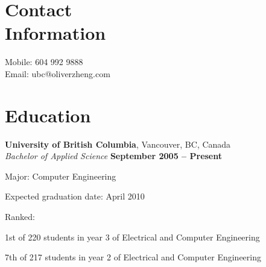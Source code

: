 \documentclass[margin,line]{resume}
\begin{document}
\begin{resume}

    \section{\mysidestyle Contact\\Information}

    Mobile: 604 992 9888       %
        \vspace{0mm}\\\vspace{0mm}%
    Email: ubc@oliverzheng.com %

    \section{\mysidestyle Education}

    \textbf{University of British Columbia}, Vancouver, BC, Canada
        \vspace{2mm}\\\vspace{1mm}%
    \textsl{Bachelor of Applied Science} \hfill \textbf{September 2005 -- Present}
        \vspace{-3mm}\\\vspace{-1mm}%
    \begin{list2}
        \item Major: Computer Engineering
        \item Expected graduation date: April 2010
        \item Ranked:
        \begin{list3}
            \item 1st of 220 students in year 3 of Electrical and Computer Engineering
            \item 7th of 217 students in year 2 of Electrical and Computer Engineering
        \end{list3}
    \end{list2}
    \vspace{-1.5mm}


\end{resume}
\end{document}
